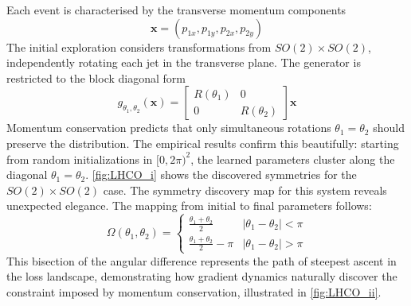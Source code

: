             Each event is characterised by the transverse momentum components
            \[
                \mathbf{x} = (p_{1x}, p_{1y}, p_{2x}, p_{2y})
            \]
            The initial exploration considers transformations from \(SO(2) \times SO(2)\), independently rotating each jet in the transverse plane.
            The generator is restricted to the block diagonal form
            \[
                g_{\theta_1,\theta_2}(\mathbf{x}) = \begin{bmatrix}
                    R(\theta_1) & 0 \\
                    0 & R(\theta_2)
                \end{bmatrix} \mathbf{x}
            \]
            Momentum conservation predicts that only simultaneous rotations \(\theta_1 = \theta_2\) should preserve the distribution.
            The empirical results confirm this beautifully: starting from random initializations in \([0, 2\pi)^2\), the learned parameters cluster along the diagonal \(\theta_1 = \theta_2\).
            \cref{fig:LHCO_i} shows the discovered symmetries for the \(SO(2) \times SO(2)\) case.
            The symmetry discovery map for this system reveals unexpected elegance.
            The mapping from initial to final parameters follows:
            \[
                \Omega(\theta_1, \theta_2) = \begin{cases}
                    \frac{\theta_1 + \theta_2}{2} & |\theta_1 - \theta_2| < \pi \\
                    \frac{\theta_1 + \theta_2}{2} - \pi & |\theta_1 - \theta_2| > \pi
                \end{cases}
            \]
            This bisection of the angular difference represents the path of steepest ascent in the loss landscape, demonstrating how gradient dynamics naturally discover the constraint imposed by momentum conservation, illustrated in \cref{fig:LHCO_ii}.
